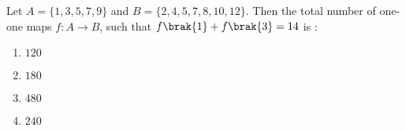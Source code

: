 \item Let $A = \{ 1, 3, 5, 7, 9\}$ and $B = \{ 2, 4, 5, 7, 8, 10, 12 \}$. Then the total
    number of one-one maps $f : A \rightarrow B$, such that $f\brak{1} + f\brak{3} = 14$ is :
		\hfill{}
	\begin{multicols}{4}
		\begin{enumerate}
			\item $120$ \columnbreak
			\item $180$ \columnbreak
			\item $480$ \columnbreak
			\item $240$
		\end{enumerate}
	\end{multicols}
